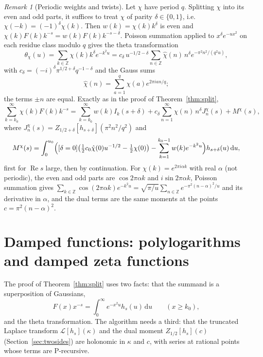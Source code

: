 \documentclass[11pt,reqno]{amsart}
\theoremstyle{definition}
\theoremstyle{remark}
\newtheorem{remark}[theorem]{Remark}
\newcommand{\dd}{\,\mathrm{d}}
\newcommand{\ZZ}{\mathbb{Z}}
\begin{document}
\begin{remark}[Periodic weights and twists]\label{rem:twist}
Let $\chi$ have period $q$. Splitting $\chi$ into its even and odd parts, it suffices to treat $\chi$ of parity
$\delta \in \{0,1\}$, i.e.\ $\chi(-k) = (-1)^\delta\chi(k)$. Then $w(k) = \chi(k)k^\delta$ is even and
$\chi(k)F(k)k^{-s} = w(k)F(k)k^{-s-\delta}$. Poisson summation applied to $x^\delta e^{-ux^2}$ on each residue class
modulo $q$ gives the theta transformation
\[
  \theta_\chi(u) = \sum_{k\in\ZZ}\chi(k)k^\delta e^{-k^2u} = c_\delta\,u^{-1/2-\delta}\sum_{n\in\ZZ}\hat\chi(n)\,n^\delta
  e^{-\pi^2n^2/(q^2u)},
\]
with $c_\delta = (-i)^\delta\pi^{1/2+\delta}q^{-1-\delta}$ and the Gauss sums
\[
  \hat\chi(n) = \sum_{a=1}^{q}\chi(a)e^{2\pi ian/q};
\]
the terms $\pm n$ are equal. Exactly as in the proof of
Theorem~\ref{thm:split},
\[
  \sum_{k=k_0}^{\infty}\chi(k)F(k)k^{-s} = \sum_{k=k_0}^{\infty}w(k)I_k(s+\delta)
  + c_\delta\sum_{n=1}^{\infty}\hat\chi(n)\,n^\delta J^\chi_n(s) + M^\chi(s),
\]
where $J^\chi_n(s) = Z_{1/2+\delta}[h_{s+\delta}](\pi^2n^2/q^2)$ and
\[
  M^\chi(s) = \int_0^{u_0}\Bigl([\delta = 0]\bigl(\tfrac12c_0\hat\chi(0)u^{-1/2} - \tfrac12\chi(0)\bigr)
  - \sum_{k=1}^{k_0-1}w(k)e^{-k^2u}\Bigr)h_{s+\delta}(u)\dd u,
\]
first for $\operatorname{Re}s$ large, then by continuation. For $\chi(k) = e^{2\pi i\alpha k}$ with real $\alpha$
(not periodic), the even and odd parts are $\cos2\pi\alpha k$ and $i\sin2\pi\alpha k$, Poisson summation gives
$\sum_{k\in\ZZ}\cos(2\pi\alpha k)e^{-k^2u} = \sqrt{\pi/u}\sum_{n\in\ZZ}e^{-\pi^2(n-\alpha)^2/u}$ and its derivative in
$\alpha$, and the dual terms are the same moments at the points $c = \pi^2(n-\alpha)^2$.
\end{remark}

\section{Damped functions: polylogarithms and damped zeta functions}\label{sec:beyond}

The proof of Theorem~\ref{thm:split} uses two facts: that the summand is a superposition of Gaussians,
\[
  F(x)x^{-s} = \int_0^\infty e^{-x^2u}h_s(u)\dd u \qquad (x \ge k_0),
\]
and the theta transformation. The algorithm needs a third: that the truncated Laplace transform $\mathcal L[h_s](\kappa)$
and the dual moment $Z_{1/2}[h_s](c)$ (Section~\ref{sec:twosides}) are holonomic in $\kappa$ and $c$, with series at
rational points whose terms are P-recursive.
\end{document}
